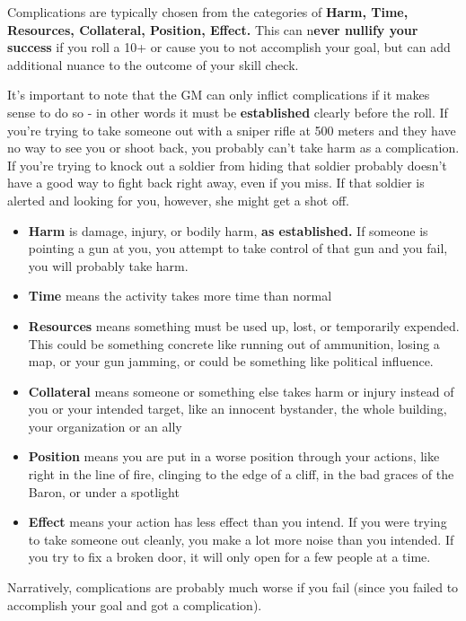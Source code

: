 Complications are typically chosen from the categories of \textbf{Harm, Time, Resources, Collateral, Position, Effect.} This can n\textbf{ever nullify your success} if you roll a 10+ or cause you to not accomplish your goal, but can add additional nuance to the outcome of your skill check.


It’s important to note that the GM can only inflict complications if it makes sense to do so - in other words it must be \textbf{established} clearly before the roll. If you’re trying to take someone out with a sniper rifle at 500 meters and they have no way to see you or shoot back, you probably can’t take harm as a complication. If you’re trying to knock out a soldier from hiding that soldier probably doesn’t have a good way to fight back right away, even if you miss. If that soldier is alerted and looking for you, however, she might get a shot off.

\begin{itemize}
\item \textbf{Harm} is damage, injury, or bodily harm, \textbf{as established.} If someone is pointing a gun at you, you attempt to take control of that gun and you fail, you will probably take harm.
\item \textbf{Time} means the activity takes more time than normal
\item \textbf{Resources} means something must be used up, lost, or temporarily expended. This could be something concrete like running out of ammunition, losing a map, or your gun jamming, or could be something like political influence.
\item \textbf{Collateral} means someone or something else takes harm or injury instead of you or your intended target, like an innocent bystander, the whole building, your organization or an ally
\item \textbf{Position} means you are put in a worse position through your actions, like right in the line of fire, clinging to the edge of a cliff, in the bad graces of the Baron, or under a spotlight
\item \textbf{Effect} means your action has less effect than you intend. If you were trying to take someone out cleanly, you make a lot more noise than you intended. If you try to fix a broken door, it will only open for a few people at a time.
\end{itemize}  

Narratively, complications are probably much worse if you fail (since you failed to accomplish your goal and got a complication). 

